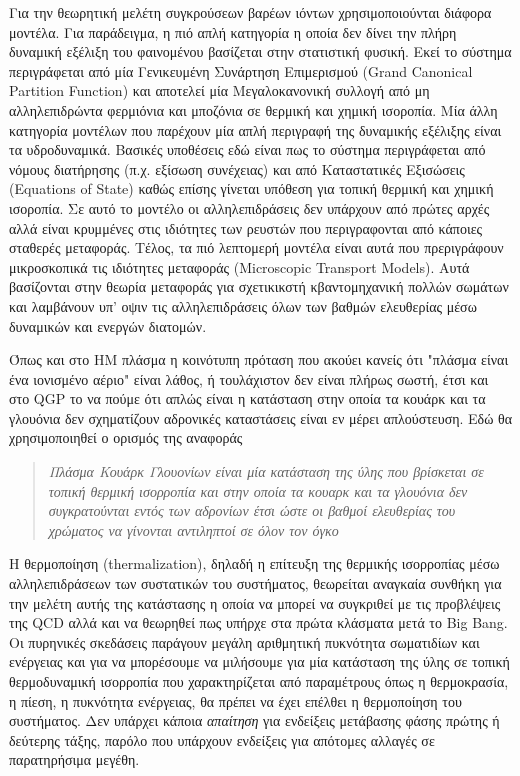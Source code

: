 	Για την θεωρητική μελέτη συγκρούσεων βαρέων ιόντων χρησιμοποιούνται διάφορα μοντέλα. Για παράδειγμα, η πιό απλή κατηγορία η οποία δεν δίνει την πλήρη δυναμική εξέλιξη του φαινομένου βασίζεται στην στατιστική φυσική. Εκεί το σύστημα περιγράφεται από μία Γενικευμένη Συνάρτηση Επιμερισμού (Grand Canonical Partition Function) και αποτελεί μία Μεγαλοκανονική συλλογή από μη αλληλεπιδρώντα φερμιόνια και μποζόνια σε θερμική και χημική ισοροπία. 
	Μία άλλη κατηγορία μοντέλων που παρέχουν μία απλή περιγραφή της δυναμικής εξέλιξης είναι τα υδροδυναμικά. Βασικές υποθέσεις εδώ είναι πως το σύστημα περιγράφεται από  νόμους διατήρησης (π.χ. εξίσωση συνέχειας) και από Καταστατικές Εξισώσεις (Equations of State) καθώς επίσης γίνεται υπόθεση για τοπική θερμική και χημική ισοροπία. Σε αυτό το μοντέλο οι αλληλεπιδράσεις δεν υπάρχουν από πρώτες αρχές αλλά είναι κρυμμένες στις ιδιότητες των ρευστών που περιγραφονται από κάποιες σταθερές μεταφοράς.
	Τέλος, τα πιό λεπτομερή μοντέλα είναι αυτά που πρεριγράφουν μικροσκοπικά τις ιδιότητες μεταφοράς (Microscopic Transport Models). Αυτά βασίζονται στην θεωρία μεταφοράς για σχετικικστή κβαντομηχανική πολλών σωμάτων και λαμβάνουν υπ' οψιν τις αλληλεπιδράσεις όλων των βαθμών ελευθερίας μέσω δυναμικών και ενεργών διατομών.
	
	Όπως και στο ΗΜ πλάσμα η κοινότυπη πρόταση που ακούει κανείς ότι "πλάσμα είναι ένα ιονισμένο αέριο" είναι λάθος, ή τουλάχιστον δεν είναι πλήρως σωστή, έτσι και στο QGP το να πούμε ότι απλώς είναι η κατάσταση στην οποία τα κουάρκ και τα γλουόνια δεν σχηματίζουν αδρονικές καταστάσεις είναι εν μέρει απλούστευση. 
	Εδώ θα χρησιμοποιηθεί ο ορισμός της αναφοράς \cite{dd}
	\begin{quote}
		\textit{Πλάσμα Κουάρκ Γλουονίων είναι μία κατάσταση της ύλης που βρίσκεται σε τοπική θερμική ισορροπία και στην οποία τα κουαρκ και τα γλουόνια δεν συγκρατούνται εντός των αδρονίων έτσι ώστε οι βαθμοί ελευθερίας του χρώματος να γίνονται αντιληπτοί σε όλον τον όγκο}
	\end{quote}
	
	Η θερμοποίηση (thermalization), δηλαδή η επίτευξη της θερμικής ισορροπίας μέσω 
αλληλεπιδράσεων των συστατικών του συστήματος, θεωρείται αναγκαία συνθήκη για την μελέτη αυτής της κατάστασης η οποία να μπορεί να συγκριθεί με τις προβλέψεις της QCD αλλά και να θεωρηθεί πως υπήρχε στα πρώτα κλάσματα μετά το Big Bang. 
	Οι πυρηνικές σκεδάσεις παράγουν μεγάλη αριθμητική πυκνότητα σωματιδίων και ενέργειας και για να μπορέσουμε να μιλήσουμε για μία κατάσταση της ύλης σε τοπική θερμοδυναμική ισορροπία που χαρακτηρίζεται από παραμέτρους όπως η θερμοκρασία, η πίεση, η πυκνότητα ενέργειας, θα πρέπει να έχει επέλθει η θερμοποίηση του συστήματος.
	Δεν υπάρχει κάποια \textit{απαίτηση} για ενδείξεις μετάβασης φάσης πρώτης ή δεύτερης τάξης, παρόλο που υπάρχουν ενδείξεις για απότομες αλλαγές σε παρατηρήσιμα μεγέθη.
	
